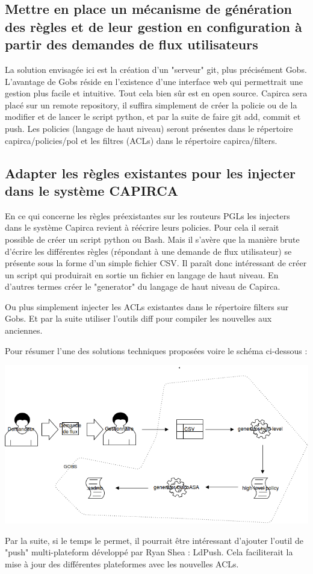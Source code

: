 \documentclass{article}
\begin{document}
\subsection{Mettre en place un mécanisme de génération des règles et de leur gestion en configuration à partir des demandes de flux utilisateurs}

La solution envisagée ici est la création d’un "serveur" git, plus précisément Gobs. L’avantage de Gobs réside en l’existence d’une interface web qui permettrait une gestion plus facile et intuitive. Tout cela bien sûr est en open source. Capirca sera placé sur un remote repository, il suffira simplement de créer la policie ou de la modifier et de lancer le script python, et par la suite de faire git add, commit et push. Les policies (langage de haut niveau) seront présentes dans le répertoire capirca/policies/pol et les filtres (ACLs) dans le répertoire capirca/filters. 

\maketitle
\subsection{Adapter les règles existantes pour les injecter dans le système CAPIRCA}

En ce qui concerne les règles préexistantes sur les routeurs PGLs les injecters dans le système Capirca revient à réécrire leurs policies. Pour cela il serait possible de créer un script python ou Bash. Mais il s’avère que la manière brute d’écrire les différentes règles (répondant à une demande de flux utilisateur) se présente sous la forme d’un simple fichier CSV. Il paraît donc intéressant de créer un script qui produirait en sortie un fichier en langage de haut niveau. En d’autres termes créer le "generator" du langage de haut niveau de Capirca.

Ou plus simplement injecter les ACLs existantes dans le répertoire filters sur Gobs. Et par la suite utiliser l'outils diff pour compiler les nouvelles aux anciennes. 
 
Pour résumer l'une des solutions techniques proposées voire le schéma ci-dessous :

\centerline{\includegraphics[scale=0.4]{spec.png}}

Par la suite, si le temps le permet, il pourrait être intéressant d'ajouter l'outil de "push" multi-plateform développé par Ryan Shea : LdPush. Cela faciliterait la mise à jour des différentes plateformes avec les nouvelles ACLs.
\end{document}
